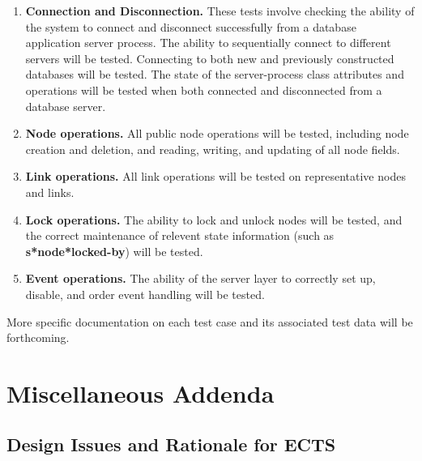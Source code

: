 \begin{enumerate}

\item {\bf Connection and Disconnection.}  These tests involve checking
the ability of the system to connect and disconnect successfully from
a database application server process.   The ability to sequentially connect
to different servers will be tested.  Connecting to both new and previously
constructed databases will be tested.  The state of the server-process class
attributes and operations will be tested when both connected and disconnected
from a database server.

\item  {\bf Node operations.}  All public node operations will be tested, 
including node creation and deletion, and reading, writing, and
updating of all node fields.  

\item {\bf Link operations.}  All link operations will be tested on
representative nodes and links.   

\item {\bf Lock operations.}  The ability to lock and unlock nodes will
be tested, and the correct maintenance of relevent state information (such 
as {\bf s*node*locked-by}) will be tested.

\item {\bf Event operations.}  The ability of the server layer to 
correctly set up, disable, and order event handling will be tested.

\end{enumerate}

More specific documentation on each test case and its associated test data
will be forthcoming. 



\appendix
\chapter{Miscellaneous Addenda}
\section{Design Issues and Rationale for ECTS}
\label{app:ects}

